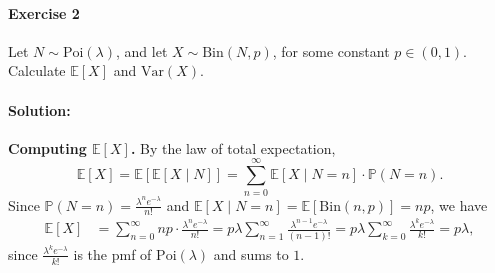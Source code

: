 \documentclass[a4paper,12pt]{article}
\begin{document}
\paragraph{Exercise 2}  Let $N \sim \textrm{Poi}(\lambda)$, and let $X \sim \textrm{Bin}(N,p)$, for some constant $p \in (0,1)$. Calculate $\mathbb{E}[X]$ and $\textrm{Var}(X)$.
\paragraph{Solution:}

\textbf{Computing $\mathbb{E}[X]$.} By the law of total expectation,
\[
    \mathbb{E}[X] = \mathbb{E}[\mathbb{E}[X \mid N]] = \sum_{n=0}^{\infty} \mathbb{E}[X \mid N=n] \cdot \mathbb{P}(N=n).
\]
Since $\mathbb{P}(N=n) = \frac{\lambda^n e^{-\lambda}}{n!}$ and $\mathbb{E}[X \mid N=n] = \mathbb{E}[\mathrm{Bin}(n,p)] = np$, we have
\begin{align*}
    \mathbb{E}[X] &= \sum_{n=0}^{\infty} np \cdot \frac{\lambda^n e^{-\lambda}}{n!} = p\lambda \sum_{n=1}^{\infty} \frac{\lambda^{n-1} e^{-\lambda}}{(n-1)!} = p\lambda \sum_{k=0}^{\infty} \frac{\lambda^k e^{-\lambda}}{k!} = p\lambda,
\end{align*}
since $\frac{\lambda^k e^{-\lambda}}{k!}$ is the pmf of $\mathrm{Poi}(\lambda)$ and sums to $1$.
\end{document}
